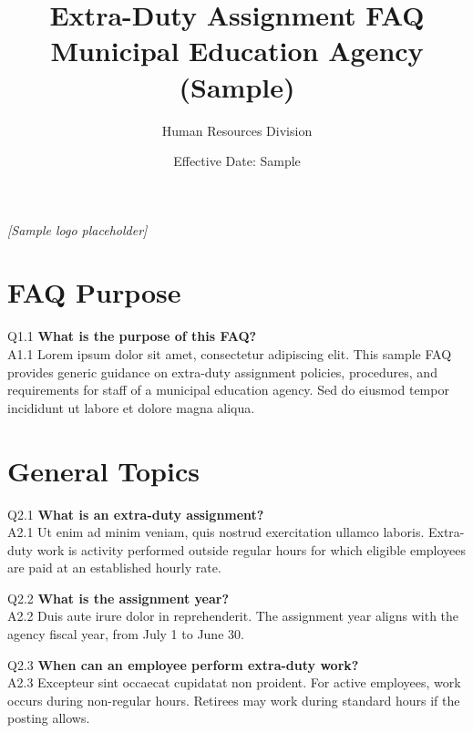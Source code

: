 \documentclass[11pt,a4paper,oneside]{article}
\title{Extra-Duty Assignment FAQ\\Municipal Education Agency (Sample)}
\author{Human Resources Division}
\date{Effective Date: Sample}
\begin{document}
\maketitle

\begin{center}
  \vspace{6pt}
  \textit{[Sample logo placeholder]}
\end{center}

\newpage
\tableofcontents
\newpage

\section{FAQ Purpose}
\noindent Q1.1 \textbf{What is the purpose of this FAQ?}\\
\noindent A1.1 Lorem ipsum dolor sit amet, consectetur adipiscing elit. This sample FAQ provides generic guidance on extra-duty assignment policies, procedures, and requirements for staff of a municipal education agency. Sed do eiusmod tempor incididunt ut labore et dolore magna aliqua.\vspace{6pt}

\section{General Topics}
\noindent Q2.1 \textbf{What is an extra-duty assignment?}\\
\noindent A2.1 Ut enim ad minim veniam, quis nostrud exercitation ullamco laboris. Extra-duty work is activity performed outside regular hours for which eligible employees are paid at an established hourly rate.\vspace{6pt}

\noindent Q2.2 \textbf{What is the assignment year?}\\
\noindent A2.2 Duis aute irure dolor in reprehenderit. The assignment year aligns with the agency fiscal year, from July 1 to June 30.\vspace{6pt}

\noindent Q2.3 \textbf{When can an employee perform extra-duty work?}\\
\noindent A2.3 Excepteur sint occaecat cupidatat non proident. For active employees, work occurs during non-regular hours. Retirees may work during standard hours if the posting allows.\vspace{6pt}
\end{document}
